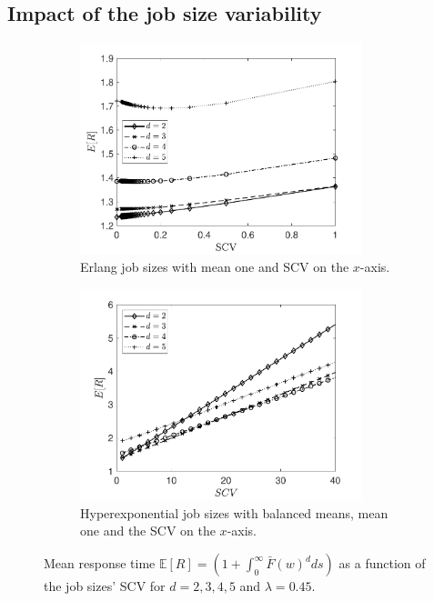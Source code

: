 \documentclass[12pt]{report}
\newcommand{\E}{\mathbb{E}}
\begin{document}
\subsection{Impact of the job size variability}\label{sec:ifo_SCV}
\begin{figure}[t]
\begin{subfigure}{.45\textwidth}
\begin{center}
\includegraphics[width=0.9\textwidth]{figures/Chapter3/plot_MRT_Erlang_identical_diffd.pdf}
\caption{Erlang job sizes with mean one and SCV on the $x$-axis.}
\label{fig:MRT_Erlangs_identical}
\end{center}
\end{subfigure}
\begin{subfigure}{.45\textwidth}
\begin{center}
\includegraphics[width=0.9\textwidth]{figures/Chapter3/plot_ifo_SCV_Redid_HExp_vard.pdf}
\caption{Hyperexponential job sizes with balanced means, mean one and the SCV on the $x$-axis.}
\label{fig:MRTdiffd}
\end{center}
\end{subfigure}
\caption{Mean response time $\E[R] =\left(1+\int_0^\infty \bar{F}(w)^d ds\right)$ as a function of the job sizes' SCV for $d=2,3,4,5$ and $\lambda=0.45$.}
\label{fig:ifo_SCV_vard}
\end{figure}
\end{document}
